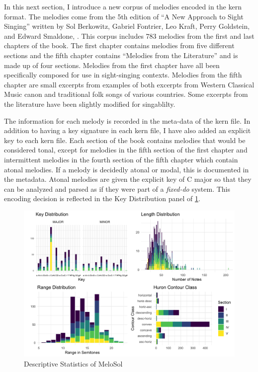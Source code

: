 \documentclass[12pt,]{book}
\begin{document}
In this next section, I introduce a new corpus of melodies encoded in the kern format.
The melodies come from the 5th edition of ``A New Approach to Sight Singing'' written by Sol Berkowitz, Gabriel Fontrier, Leo Kraft, Perry Goldstein, and Edward Smaldone, \citep{berkowitzNewApproachSight2011}.
This corpus includes 783 melodies from the first and last chapters of the book.
The first chapter contains melodies from five different sections and the fifth chapter contains ``Melodies from the Literature'' and is made up of four sections.
Melodies from the first chapter have all been specifically composed for use in sight-singing contexts.
Melodies from the fifth chapter are small excerpts from examples of both excerpts from Western Classical Music canon and traditional folk songs of various countries.
Some excerpts from the literature have been slightly modified for singablilty.

The information for each melody is recorded in the meta-data of the kern file.
In addition to having a key signature in each kern file, I have also added an explicit key to each kern file.
Each section of the book contains melodies that would be considered tonal, except for melodies in the fifth section of the first chapter and intermittent melodies in the fourth section of the fifth chapter which contain atonal melodies.
If a melody is decidedly atonal or modal, this is documented in the metadata.
Atonal melodies are given the explicit key of C major so that they can be analyzed and parsed as if they were part of a \emph{fixed-do} system.
This encoding decision is reflected in the Key Distribution panel of \ref{fig:melosoldescriptivepanel}.

\begin{figure}

{\centering \includegraphics[width=1\linewidth]{img/melosoldescriptpanel} 

}

\caption{Descriptive Statistics of MeloSol}\label{fig:melosoldescriptivepanel}
\end{figure}
\end{document}
